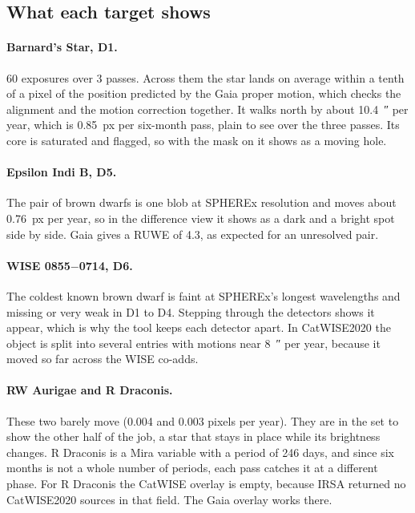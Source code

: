 \documentclass[11pt,a4paper]{article}
\begin{document}
\subsection{What each target shows}
\paragraph{Barnard's Star, D1.} 60 exposures over 3 passes. Across them the star lands on average
within a tenth of a pixel of the position predicted by the Gaia proper motion, which checks the
alignment and the motion correction together. It walks north by about \SI{10.4}{\arcsecond} per
year, which is \SI{0.85}{px} per six-month pass, plain to see over the three passes. Its core is
saturated and flagged, so with the mask on it shows as a moving hole.

\paragraph{Epsilon Indi B, D5.} The pair of brown dwarfs is one blob at SPHEREx resolution and moves
about \SI{0.76}{px} per year, so in the difference view it shows as a dark and a bright spot side
by side. Gaia gives a RUWE of 4.3, as expected for an unresolved pair.

\paragraph{WISE 0855$-$0714, D6.} The coldest known brown dwarf is faint at SPHEREx's longest
wavelengths and missing or very weak in D1 to D4. Stepping through the detectors shows it appear,
which is why the tool keeps each detector apart. In CatWISE2020 the object is split into several
entries with motions near \SI{8}{\arcsecond} per year, because it moved so far across the WISE
co-adds.

\paragraph{RW Aurigae and R Draconis.} These two barely move (0.004 and 0.003 pixels per year).
They are in the set to show the other half of the job, a star that stays in place while its
brightness changes. R Draconis is a Mira variable with a period of 246 days, and since six months
is not a whole number of periods, each pass catches it at a different phase. For R Draconis the
CatWISE overlay is empty, because IRSA returned no CatWISE2020 sources in that field. The Gaia
overlay works there.
\end{document}
